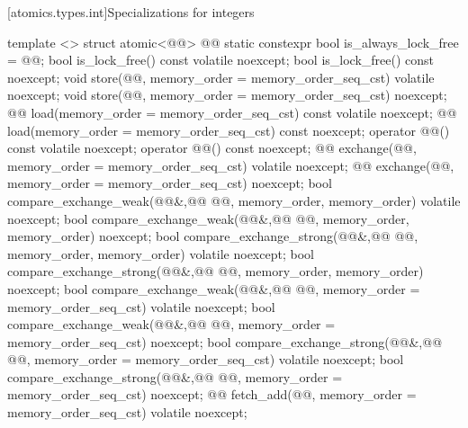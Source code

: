 [atomics.types.int]{Specializations for integers}
\begin{codeblock}
  template <> struct atomic<@@> {
    @@
    static constexpr bool is_always_lock_free = @@;
    bool is_lock_free() const volatile noexcept;
    bool is_lock_free() const noexcept;
    void store(@@, memory_order = memory_order_seq_cst) volatile noexcept;
    void store(@@, memory_order = memory_order_seq_cst) noexcept;
    @@ load(memory_order = memory_order_seq_cst) const volatile noexcept;
    @@ load(memory_order = memory_order_seq_cst) const noexcept;
    operator @@() const volatile noexcept;
    operator @@() const noexcept;
    @@ exchange(@@, memory_order = memory_order_seq_cst) volatile noexcept;
    @@ exchange(@@, memory_order = memory_order_seq_cst) noexcept;
    bool compare_exchange_weak(@@&,@\itcorr[-1]@ @@,
                               memory_order, memory_order) volatile noexcept;
    bool compare_exchange_weak(@@&,@\itcorr[-1]@ @@,
                               memory_order, memory_order) noexcept;
    bool compare_exchange_strong(@@&,@\itcorr[-1]@ @@,
                                 memory_order, memory_order) volatile noexcept;
    bool compare_exchange_strong(@@&,@\itcorr[-1]@ @@,
                                 memory_order, memory_order) noexcept;
    bool compare_exchange_weak(@@&,@\itcorr[-1]@ @@,
                               memory_order = memory_order_seq_cst) volatile noexcept;
    bool compare_exchange_weak(@@&,@\itcorr[-1]@ @@,
                               memory_order = memory_order_seq_cst) noexcept;
    bool compare_exchange_strong(@@&,@\itcorr[-1]@ @@,
                               memory_order = memory_order_seq_cst) volatile noexcept;
    bool compare_exchange_strong(@@&,@\itcorr[-1]@ @@,
                               memory_order = memory_order_seq_cst) noexcept;
    @@ fetch_add(@@, memory_order = memory_order_seq_cst) volatile noexcept;
}
\end{codeblock}
